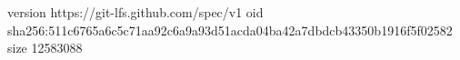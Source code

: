version https://git-lfs.github.com/spec/v1
oid sha256:511c6765a6c5c71aa92c6a9a93d51acda04ba42a7dbdcb43350b1916f5f02582
size 12583088
